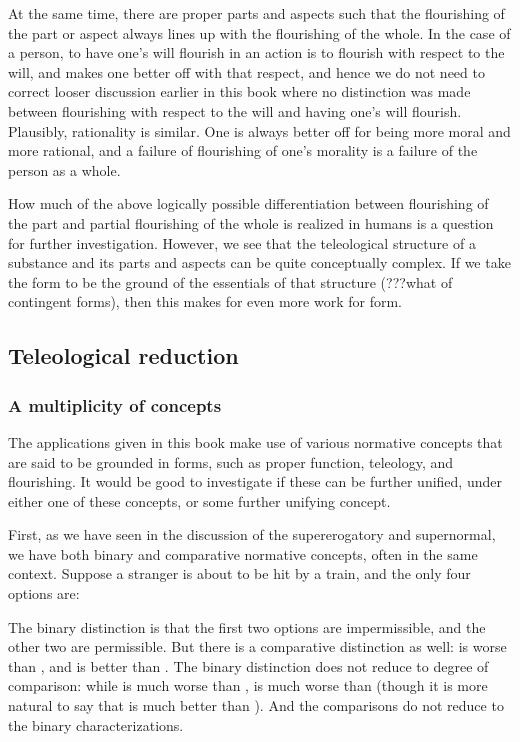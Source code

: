 At the same time, there are proper parts and aspects such that the flourishing of the part or aspect always lines up with the
flourishing of the whole. In the case of a person, to have one's will flourish in an action is to flourish with respect to the 
will, and makes one better off with that respect, and hence we do not need to correct looser discussion earlier in this book where
no distinction was made between flourishing with respect to the will and having one's will flourish. Plausibly, rationality is similar. 
One is always better off for being more moral and more rational, and a failure of flourishing of one's morality is a failure of the 
person as a whole. 

How much of the above logically possible differentiation between flourishing of the part and partial flourishing of the whole is 
realized in humans is a question for further investigation. However,
we see that the teleological structure of a substance and its parts and aspects can be quite conceptually complex. If we take
the form to be the ground of the essentials of that structure (???what of contingent forms), then this makes for even more work 
for form.

\subsection{Teleological reduction}
\subsubsection{A multiplicity of concepts}
The applications given in this book make use of various normative concepts that are said to be grounded in forms,
such as proper function, teleology, and flourishing. It would be good to investigate if these 
can be further unified, under either one of these concepts, or some further unifying concept.

First, as we have seen in the discussion of the supererogatory and supernormal, we have both binary and comparative normative 
concepts, often in the same context. Suppose a stranger is about to be hit by a train, and the only four options are:


The binary distinction is that
the first two options are impermissible, and the other two are permissible. But there is a comparative distinction
as well:  is worse than , and  is better than . The binary distinction does not reduce to
degree of comparison: while  is much worse than ,  is much worse than  (though 
it is more natural to say that  is much better than ). And the comparisons do not reduce to the binary 
characterizations.

